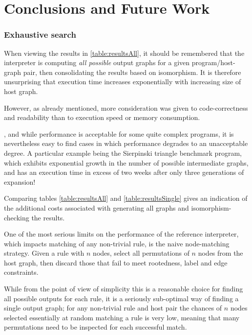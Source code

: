 
\section{Conclusions and Future Work}
\label{sec:conclusionsfuture}





\subsubsection*{Exhaustive search}

When viewing the results in \ref{table:resultsAll}, it should be remembered that the interpreter is computing \textit{all possible} output graphs for a given program/host-graph pair, then consolidating the results based on isomorphism. It is therefore unsurprising that execution time increases exponentially with increasing size of host graph.

However, as already mentioned, more consideration was given to code-correctness and readability than to execution speed or memory consumption.

, and while performance is acceptable for some quite complex programs, it is nevertheless easy to find cases in which performance degrades to an unacceptable degree. A particular example being the Sierpinski triangle benchmark program, which exhibits exponential growth in the number of possible intermediate graphs, and has an execution time in excess of two weeks after only three generations of expansion!

Comparing tables \ref{table:resultsAll} and \ref{table:resultsSingle} gives an indication of the additional costs associated with generating all graphs and isomorphism-checking the results.

One of the most serious limits on the performance of the reference interpreter, which impacts matching of any non-trivial rule, is the naive node-matching strategy. Given a rule with $n$ nodes, select all permutations of $n$ nodes from the host graph, then discard those that fail to meet rootedness, label and edge constraints.

While from the point of view of simplicity this is a reasonable choice for finding all possible outputs for each rule, it is a seriously sub-optimal way of finding a single output graph; for any non-trivial rule and host pair the chances of $n$ nodes selected essentially at random matching a rule is very low, meaning that many permutations need to be inspected for each successful match.

